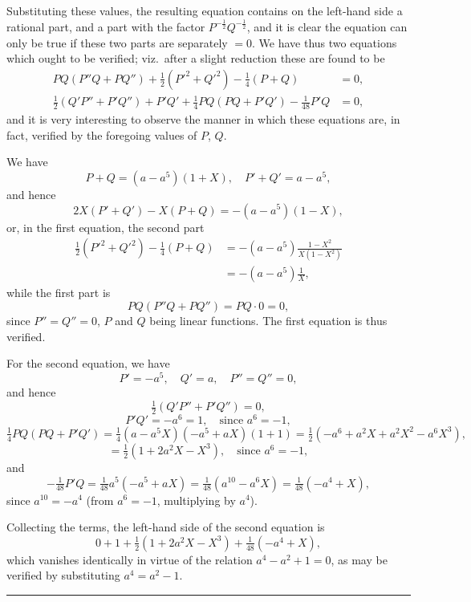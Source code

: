 \documentclass[12pt,a4paper]{article}
\theoremstyle{plain}
\begin{document}
Substituting these values, the resulting equation contains on the left-hand
side a rational part, and a part with the factor $P^{-\frac{1}{2}}Q^{-\frac{1}{2}}$,
and it is clear the equation can only be true if these two parts are separately
$=0$. We have thus two equations which ought to be verified; viz.~after
a slight reduction these are found to be
\begin{align*}
PQ(P''Q+PQ'') + \tfrac{1}{2}(P'^2+Q'^2) - \tfrac{1}{4}(P+Q) &= 0,\\
\tfrac{1}{2}(Q'P''+P'Q'') + P'Q' + \tfrac{1}{4}PQ(PQ+P'Q') - \tfrac{1}{48}P'Q &= 0,
\end{align*}
and it is very interesting to observe the manner in which these equations
are, in fact, verified by the foregoing values of $P$, $Q$.

We have
\[
P+Q = (a-a^5)(1+X),\quad P'+Q' = a-a^5,
\]
and hence
\[
2X(P'+Q')-X(P+Q) = -(a-a^5)(1-X),
\]
or, in the first equation, the second part
\begin{align*}
\tfrac{1}{2}(P'^2+Q'^2)-\tfrac{1}{4}(P+Q)
&= -(a-a^5)\frac{1-X^2}{X(1-X^2)}\\
&= -(a-a^5)\frac{1}{X},
\end{align*}
while the first part is
\[
PQ(P''Q+PQ'') = PQ\cdot 0 = 0,
\]
since $P''=Q''=0$, $P$ and $Q$ being linear functions. The first equation
is thus verified.

For the second equation, we have
\[
P' = -a^5,\quad Q' = a,\quad P'' = Q'' = 0,
\]
and hence
\[
\tfrac{1}{2}(Q'P''+P'Q'') = 0,
\]
\[
P'Q' = -a^6 = 1,\quad\text{since $a^6=-1$},
\]
\[
\tfrac{1}{4}PQ(PQ+P'Q') = \tfrac{1}{4}(a-a^5X)(-a^5+aX)(1+1)
= \tfrac{1}{2}(-a^6+a^2X+a^2X^2-a^6X^3),
\]
\[
= \tfrac{1}{2}(1+2a^2X-X^3),\quad\text{since $a^6=-1$},
\]
and
\[
-\tfrac{1}{48}P'Q = \tfrac{1}{48}a^5(-a^5+aX) = \tfrac{1}{48}(a^{10}-a^6X)
= \tfrac{1}{48}(-a^4+X),
\]
since $a^{10}=-a^4$ (from $a^6=-1$, multiplying by $a^4$).

Collecting the terms, the left-hand side of the second equation is
\[
0 + 1 + \tfrac{1}{2}(1+2a^2X-X^3) + \tfrac{1}{48}(-a^4+X),
\]
which vanishes identically in virtue of the relation $a^4-a^2+1=0$,
as may be verified by substituting $a^4=a^2-1$.

\vspace{2em}
\begin{center}
\rule{0.5\textwidth}{0.4pt}
\end{center}
\end{document}
